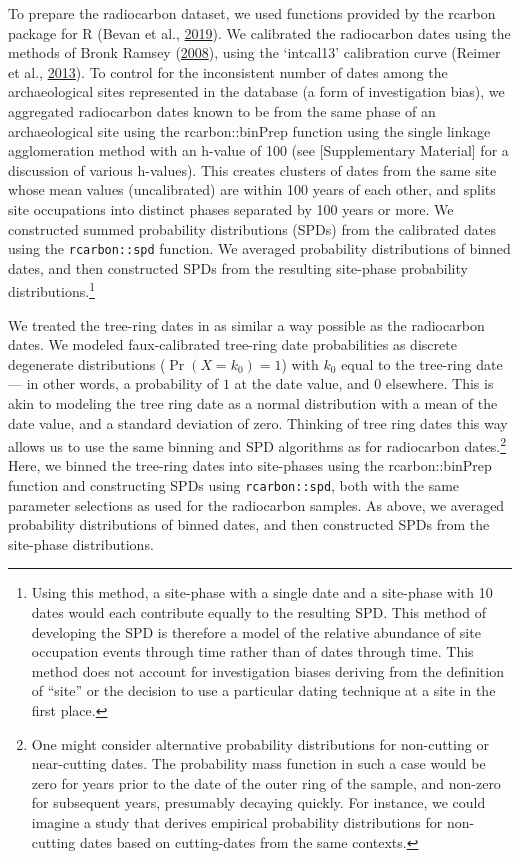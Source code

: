 \documentclass[
]{sa}
\begin{document}
To prepare the radiocarbon dataset, we used functions provided by the rcarbon package for R (Bevan et al., \protect\hyperlink{ref-Bevan2019}{2019}). We calibrated the radiocarbon dates using the methods of Bronk Ramsey (\protect\hyperlink{ref-Bronk2008}{2008}), using the `intcal13' calibration curve (Reimer et al., \protect\hyperlink{ref-Reimer2013}{2013}). To control for the inconsistent number of dates among the archaeological sites represented in the database (a form of investigation bias), we aggregated radiocarbon dates known to be from the same phase of an archaeological site using the rcarbon::binPrep function using the single linkage agglomeration method with an h-value of 100 (see {[}Supplementary Material{]} for a discussion of various h-values). This creates clusters of dates from the same site whose mean values (uncalibrated) are within 100 years of each other, and splits site occupations into distinct phases separated by 100 years or more. We constructed summed probability distributions (SPDs) from the calibrated dates using the \texttt{rcarbon::spd} function. We averaged probability distributions of binned dates, and then constructed SPDs from the resulting site-phase probability distributions.\footnote{Using this method, a site-phase with a single date and a site-phase with 10 dates would each contribute equally to the resulting SPD. This method of developing the SPD is therefore a model of the relative abundance of site occupation events through time rather than of dates through time. This method does not account for investigation biases deriving from the definition of ``site'' or the decision to use a particular dating technique at a site in the first place.}

We treated the tree-ring dates in as similar a way possible as the radiocarbon dates. We modeled faux-calibrated tree-ring date probabilities as discrete degenerate distributions (\(\Pr(X=k_0)=1\)) with \(k_0\) equal to the tree-ring date --- in other words, a probability of \(1\) at the date value, and \(0\) elsewhere. This is akin to modeling the tree ring date as a normal distribution with a mean of the date value, and a standard deviation of zero. Thinking of tree ring dates this way allows us to use the same binning and SPD algorithms as for radiocarbon dates.\footnote{One might consider alternative probability distributions for non-cutting or near-cutting dates. The probability mass function in such a case would be zero for years prior to the date of the outer ring of the sample, and non-zero for subsequent years, presumably decaying quickly. For instance, we could imagine a study that derives empirical probability distributions for non-cutting dates based on cutting-dates from the same contexts.} Here, we binned the tree-ring dates into site-phases using the rcarbon::binPrep function and constructing SPDs using \texttt{rcarbon::spd}, both with the same parameter selections as used for the radiocarbon samples. As above, we averaged probability distributions of binned dates, and then constructed SPDs from the site-phase distributions.
\end{document}
